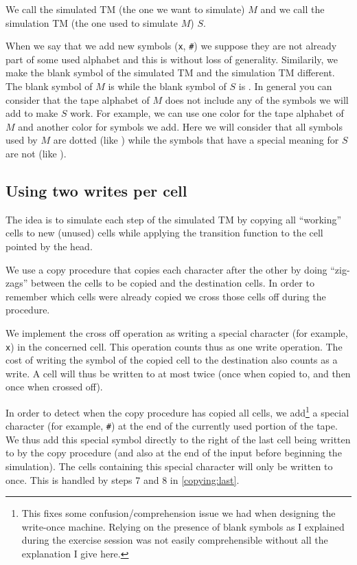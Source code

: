\documentclass{article}
\newcommand{\0}{\texttt{\textvisiblespace}}
\newcommand{\°}{\obullet{\0}}
\newcommand{\X}{\texttt{x}}
\newcommand{\e}{\texttt{\#}}
\newcommand{\TM}{TM}
\begin{document}
We call the simulated \TM{} (the one we want to simulate) \(M\) and we
call the simulation \TM{} (the one used to simulate \(M\)) \(S\).

When we say that we add new symbols (\X{}, \e{}) we suppose they
are not already part of some used alphabet and this is without loss of
generality.
Similarily, we make the blank symbol of the simulated \TM{} and the
simulation \TM{} different. The blank symbol of \(M\)
is \°{} while the blank symbol of \(S\)
is \0{}. In general you can consider that the tape alphabet of \(M\)
does not include any of the symbols we will add to make \(S\) work.
For example, we can use one color for the tape alphabet of \(M\) and
another color for symbols we add. Here we will consider that all symbols used
by \(M\) are dotted (like \°{}) while the symbols that
have a special meaning for \(S\) are not (like \0{}).

\subsection{Using two writes per cell}
The idea is to simulate each step of the simulated
\TM{} by copying all ``working'' cells to new (unused) cells
while applying the transition function to the cell pointed by the head.

We use a copy procedure that copies each character after
the other by doing ``zig-zags'' between the cells to be copied and the destination
cells. In order to remember which cells were already copied we cross those
cells off during the procedure.

We implement the cross off operation as
writing a special character (for example, \X{}) in the concerned cell.
This operation counts thus as one write operation. The cost of writing the
symbol of the copied cell to the destination also counts as a write. A cell
will thus be written to at most twice (once when copied to, and then
once when crossed off).

In order to detect when the copy procedure has copied all cells,
we add\footnote{%
This fixes some confusion/comprehension issue we had when designing the
write-once machine. Relying on the presence of blank symbols as I explained
during the exercise session was not easily comprehensible without all the
explanation I give here.}
a special character (for example, \e)
at the end of the currently used portion of the tape.
We thus add this special symbol directly to the right of the last cell being written to by the
copy procedure (and also at the end of the input before beginning the
simulation). The cells containing this special character will only be written to once.
This is handled by steps 7 and 8 in \ref{copying:last}.
\end{document}
